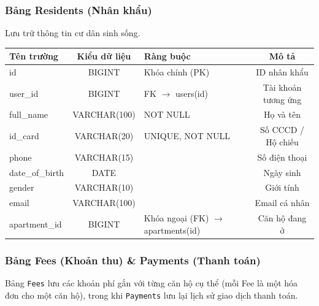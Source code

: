 \documentclass[12pt,a4paper]{article}
\begin{document}
\subsubsection{Bảng Residents (Nhân khẩu)}
Lưu trữ thông tin cư dân sinh sống.
\begin{table}[H]
    \centering
    \begin{tabularx}{\textwidth}{|L{3cm}|c|X|c|}
    \hline
    \textbf{Tên trường} & \textbf{Kiểu dữ liệu} & \textbf{Ràng buộc} & \textbf{Mô tả} \\
    \hline
    id & BIGINT & Khóa chính (PK) & ID nhân khẩu \\
    \hline
    user\_id & BIGINT & FK $\rightarrow$ users(id) & Tài khoản tương ứng \\
    \hline
    full\_name & VARCHAR(100) & NOT NULL & Họ và tên \\
    \hline
    id\_card & VARCHAR(20) & UNIQUE, NOT NULL & Số CCCD / Hộ chiếu \\
    \hline
    phone & VARCHAR(15) & & Số điện thoại \\
    \hline
    date\_of\_birth & DATE & & Ngày sinh \\
    \hline
    gender & VARCHAR(10) & & Giới tính \\
    \hline
    email & VARCHAR(100) & & Email cá nhân \\
    \hline
    apartment\_id & BIGINT & Khóa ngoại (FK) $\rightarrow$ apartments(id) & Căn hộ đang ở \\
    \hline
    \end{tabularx}
\end{table}

\subsubsection{Bảng Fees (Khoản thu) \& Payments (Thanh toán)}
Bảng \texttt{Fees} lưu các khoản phí gắn với từng căn hộ cụ thể (mỗi Fee là một hóa đơn cho một căn hộ), trong khi \texttt{Payments} lưu lại lịch sử giao dịch thanh toán.
\end{document}
